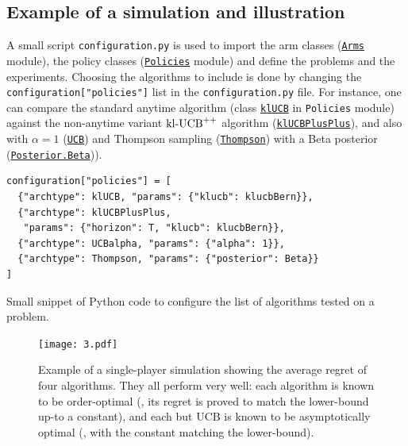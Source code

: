 \subsection{Example of a simulation and illustration}

A small script \texttt{configuration.py}
is used to import the arm classes (\texttt{\href{https://SMPyBandits.GitHub.io/docs/Arms.html}{Arms}} module), the policy classes (\texttt{\href{https://SMPyBandits.GitHub.io/docs/Policies.html}{Policies}} module) and define the problems and the experiments.
Choosing the algorithms to include is done by changing
the \texttt{configuration["policies"]} list in the \texttt{configuration.py} file.
For instance, one can compare the standard anytime \klUCB{} algorithm (class \texttt{\href{https://SMPyBandits.GitHub.io/docs/Policies.klUCB.html}{klUCB}} in \texttt{Policies} module) against the non-anytime variant $\mathrm{kl}\text{-}\mathrm{UCB}^{++}$ algorithm (\texttt{\href{https://SMPyBandits.GitHub.io/docs/Policies.klUCBPlusPlus.html}{klUCBPlusPlus}}), and also \UCB{} with $\alpha=1$ (\texttt{\href{https://SMPyBandits.GitHub.io/docs/Policies.UCBalpha.html}{UCB}}) and Thompson sampling (\texttt{\href{https://SMPyBandits.GitHub.io/docs/Policies.Thompson.html}{Thompson}}) with a Beta posterior (\texttt{\href{https://SMPyBandits.GitHub.io/docs/Policies.Posterior.Beta.html}{Posterior.Beta}})).

\begin{small}
\begin{listing}[h!]
    \begin{verbatim}
configuration["policies"] = [
  {"archtype": klUCB, "params": {"klucb": klucbBern}},
  {"archtype": klUCBPlusPlus,
   "params": {"horizon": T, "klucb": klucbBern}},
  {"archtype": UCBalpha, "params": {"alpha": 1}},
  {"archtype": Thompson, "params": {"posterior": Beta}}
]
    \end{verbatim}
    \caption{Small snippet of Python code to configure the list of algorithms tested on a problem.}
    \label{lst:3:howToConfigureAlgorithms}
\end{listing}
\end{small}

\begin{figure}[h!]  %
	\centering
	\texttt{[image: 3.pdf]}
	\caption[Example of a single-player simulation showing the average regret of $4$ algorithms]{
		Example of a single-player simulation showing the average regret of four algorithms. They all perform very well: each algorithm is known to be order-optimal (\ie, its regret is proved to match the lower-bound up-to a constant), and each but UCB is known to be asymptotically optimal (\ie, with the constant matching the lower-bound).
	}
	\label{fig:3:firstPlot}
\end{figure}

